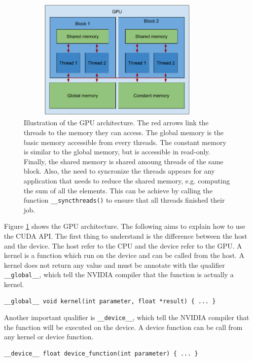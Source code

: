 \documentclass[11pt]{report}
\begin{document}
\begin{figure}[h]
\centering
\includegraphics[width=10cm, height=6cm]{gpu_architecture}
\caption[Illustration of the GPU architecture]{Illustration of the GPU architecture. The red arrows link the threads to the memory they can access. The global memory is the basic memory accessible from every threads. The constant memory is similar to the global memory, but is accessible in read-only. Finally, the shared memory is shared amoung threads of the same block. Also, the need to syncronize the threads appears for any application that needs to reduce the shared memory, e.g. computing the sum of all the elements. This can be achieve by calling the function \texttt{__syncthreads()} to ensure that all threads finished their job.}
\label{fig:gpu_architecture}
\end{figure}

\noindent Figure \ref{fig:gpu_architecture} shows the GPU architecture. The following aims to explain how to use the CUDA API. The first thing to understand is the difference between the host and the device. The host refer to the CPU and the device refer to the GPU. A kernel is a function which run on the device and can be called from the host. A kernel does not return any value and must be annotate with the qualifier \texttt{__global__}, which tell the NVIDIA compiler that the function is actually a kernel.

\begin{verbatim}
__global__ void kernel(int parameter, float *result) { ... }
\end{verbatim}

\noindent Another important qualifier is \texttt{__device__}, which tell the NVIDIA compiler that the function will be executed on the device. A device function can be call from any kernel or device function.

\begin{verbatim}
__device__ float device_function(int parameter) { ... }
\end{verbatim}
\end{document}
